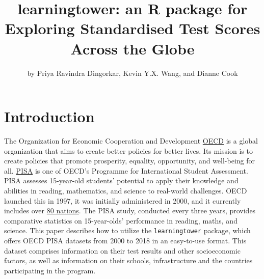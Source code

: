 \title{learningtower: an R package for Exploring Standardised Test
Scores Across the Globe}
\author{by Priya Ravindra Dingorkar, Kevin Y.X. Wang, and Dianne Cook}

\maketitle


\hypertarget{introduction}{%
\section{Introduction}\label{introduction}}

The Organization for Economic Cooperation and Development
\href{OECD\%20-\%20https://www.oecd.org/about/}{OECD} is a global
organization that aims to create better policies for better lives. Its
mission is to create policies that promote prosperity, equality,
opportunity, and well-being for all.
\href{PISA\%20-\%20https://www.oecd.org/pisa/}{PISA} is one of OECD's
Programme for International Student Assessment. PISA assesses
15-year-old students' potential to apply their knowledge and abilities
in reading, mathematics, and science to real-world challenges. OECD
launched this in 1997, it was initially administered in 2000, and it
currently includes over
\href{https://www.oecd.org/pisa/aboutpisa/pisa-participants.htm}{80
nations}. The PISA study, conducted every three years, provides
comparative statistics on 15-year-olds' performance in reading, maths,
and science. This paper describes how to utilize the
\texttt{learningtower} package, which offers OECD PISA datasets from
2000 to 2018 in an easy-to-use format. This dataset comprises
information on their test results and other socioeconomic factors, as
well as information on their schools, infrastructure and the countries
participating in the program.

